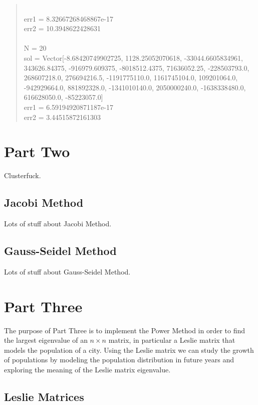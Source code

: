\documentclass[letterpaper,12pt]{article}
\begin{document}
\begin{quote}
\\err1 = 8.32667268468867e-17
\\err2 = 10.3948622428631
\\
\\N = 20
\\sol = Vector[-8.68420749902725, 1128.25052070618, -33044.6605834961, 343626.84375, -916979.609375, -8018512.4375, 71636052.25, -228503793.0, 268607218.0, 276694216.5, -1191775110.0, 1161745104.0, 109201064.0, -942929664.0, 881892328.0, -1341010140.0, 2050000240.0, -1638338480.0, 616628050.0, -85223057.0]
\\err1 = 6.59194920871187e-17
\\err2 = 3.44515872161303
\end{quote}

\newpage
\section{Part Two}


Clusterfuck.

\subsection{Jacobi Method}

Lots of stuff about Jacobi Method.

\subsection{Gauss-Seidel Method}

Lots of stuff about Gauss-Seidel Method.

\newpage
\section{Part Three}


The purpose of Part Three is to implement the Power Method in order to find the
largest eigenvalue of an $n \times n$ matrix, in particular a Leslie matrix that
models the population of a city. Using the Leslie matrix we can study the growth of populations by modeling the population distribution in future years and exploring the meaning of the Leslie matrix eigenvalue.

\subsection{Leslie Matrices}
\end{document}
